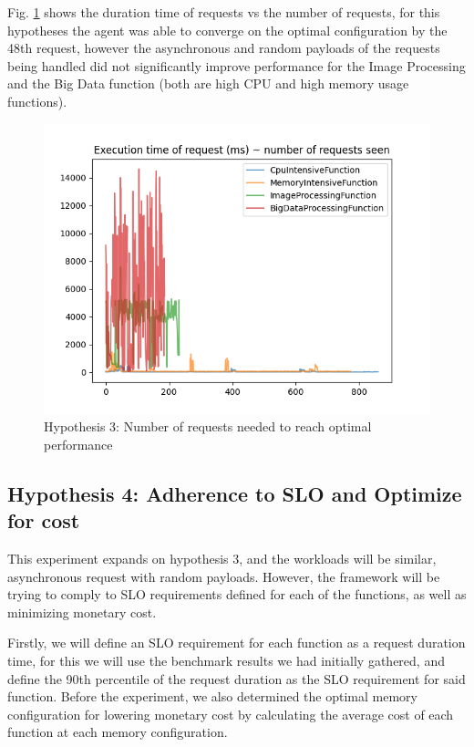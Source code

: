 \documentclass[conference]{IEEEtran}
\begin{document}
Fig. \ref{fig: h3_results} shows the duration time of requests vs the number of requests, for this hypotheses the agent was able to converge on the optimal configuration by the 48th request, however the asynchronous and random payloads of the requests being handled did not significantly improve performance for the Image Processing and the Big Data function (both are high CPU and high memory usage functions).

\begin{figure}
    \includegraphics[width=1\linewidth]{images/H3_ExecutionTimeVsNumberOfRequests.png}
    \caption{Hypothesis 3: Number of requests needed to reach optimal performance}
    \label{fig: h3_results}
\end{figure}


\subsection{Hypothesis 4: Adherence to SLO and Optimize for cost}

This experiment expands on hypothesis 3, and the workloads will be similar, asynchronous request with random  payloads. However, the framework will be trying to comply to SLO requirements defined for each of the functions, as well as minimizing monetary cost.

Firstly, we will define an SLO requirement for each function as a request duration time, for this we will use the benchmark results we had initially gathered, and define the 90th percentile of the request duration as the SLO requirement for said function. Before the experiment, we also determined the optimal memory configuration for lowering monetary cost by calculating the average cost of each function at each memory configuration.
\end{document}
